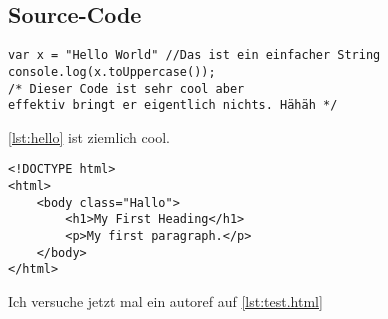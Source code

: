 \subsection{Source-Code}\label{subsec:code}
	
\begin{lstlisting}[style=htmlcssjs,float=h,caption={JavaScript Hello World Beispiel},label=lst:hello]
var x = "Hello World" //Das ist ein einfacher String
console.log(x.toUppercase());
/* Dieser Code ist sehr cool aber
effektiv bringt er eigentlich nichts. Hähäh */
\end{lstlisting}
	
\autoref{lst:hello} ist ziemlich cool.

\begin{lstlisting}[style=htmlcssjs,float=h,caption={Einfaches HTML Beispiel},label=lst:html]
<!DOCTYPE html>
<html>
	<body class="Hallo">
		<h1>My First Heading</h1>
		<p>My first paragraph.</p>
	</body>
</html>
\end{lstlisting}


Ich versuche jetzt mal ein autoref auf \autoref{lst:test.html}